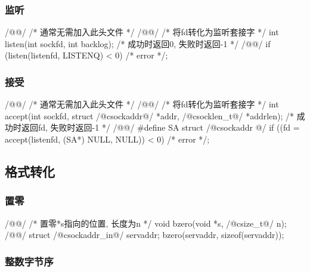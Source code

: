 \documentclass[hidelinks]{ctexart}
\begin{document}

\subsubsection{监听} %
\label{ssub:监听}

\begin{clst}
/@@/ /* 通常无需加入此头文件 */
/@@/
/* 将fd转化为监听套接字 */
int listen(int sockfd, int backlog);
/* 成功时返回0, 失败时返回-1 */
/@\lhend @/
if (listen(listenfd, LISTENQ) < 0)
    /* error */;
\end{clst}


\subsubsection{接受} %
\label{ssub:接受}

\begin{clst}
/@@/ /* 通常无需加入此头文件 */
/@@/
/* 将fd转化为监听套接字 */
int accept(int sockfd, struct /@\+c{sockaddr}@/ *addr, /@\+c{socklen\_t}@/ *addrlen);
/* 成功时返回fd, 失败时返回-1 */
/@\lhend @/
#define SA struct /@\+c{sockaddr} @/
if ((fd = accept(listenfd, (SA*) NULL, NULL)) < 0)
    /* error */;
\end{clst}



\subsection{格式转化} %
\label{sub:格式转化}

\subsubsection{置零} %
\label{ssub:置零}

\begin{clst}
/@@/
/* 置零*s指向的位置, 长度为n */
void bzero(void *s, /@\+c{size\_t}@/ n);
/@\lhend @/
struct /@\+c{sockaddr\_in}@/ servaddr;
bzero(servaddr, sizeof(servaddr));
\end{clst}


\subsubsection{整数字节序} %
\label{ssub:整数字节序}
\end{document}
